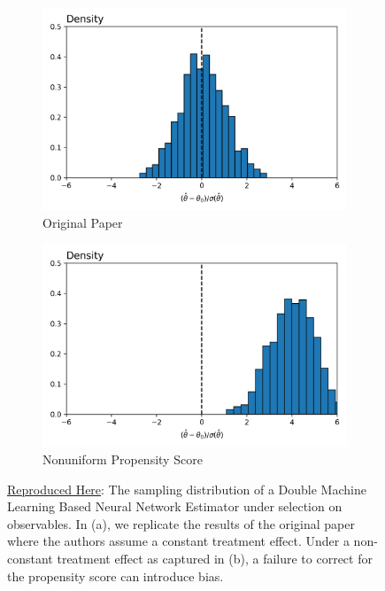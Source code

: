 \documentclass[a4paper,12pt]{article}
\begin{document}
\begin{figure}[htbp]
\centering
\begin{subfigure}{.48\textwidth}
    \centering
    \includegraphics[width=.95\linewidth]{figures/framework/dml_True.png}
    \caption{Original Paper}
\end{subfigure}
\begin{subfigure}{.48\textwidth}
    \centering
    \includegraphics[width=.95\linewidth]{figures/framework/dml_False.png}
        \caption{Nonuniform Propensity Score}
\end{subfigure}
\caption{ \href{https://github.com/pharringtonp19/rfp/blob/main/examples/scripts/dml.py}{Reproduced Here}: The sampling distribution of a Double Machine Learning Based Neural Network Estimator under selection on observables. In (a), we replicate the results of the original paper where the authors assume a constant treatment effect. Under a non-constant treatment effect as captured in (b), a failure to correct for the propensity score can introduce bias.}
\label{fig:DML}
\end{figure}
\end{document}
